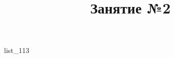\documentclass[12pt, a4paper]{article}
\begin{document}
	\title{Занятие №2}
	{list_113}
\end{document}

